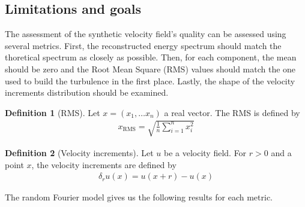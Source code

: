 \documentclass[a4paper,12pt]{article}
\theoremstyle{definition}
\newtheorem{definition}{Definition}
\begin{document}

\subsection{Limitations and goals}
The assessment of the synthetic velocity field's quality can be assessed using several metrics. First, the reconstructed energy spectrum should match the thoretical spectrum as closely as possible. Then, for each component, the mean should be zero and the Root Mean Square (RMS) values should match the one used to build the turbulence in the first place. Lastly, the shape of the velocity increments distribution should be examined. \\

\begin{definition}[RMS]
    Let $x=(x_1,\ldots x_n)$ a real vector. The RMS is defined by 
    \begin{align}
        x_\text{RMS} = \sqrt{\frac{1}{n}\sum_{i=1}^{n}x_i^2}
    \end{align}
\end{definition}

\begin{definition}[Velocity increments]
    Let $u$ be a velocity field. For $r>0$ and a point $x$, the velocity increments are defined by 
    \begin{align}
        \delta_r u(x) = u(x+r)-u(x) 
        \label{DefVelIncr}
    \end{align}
\end{definition}

The random Fourier model gives us the following results for each metric.
\end{document}
